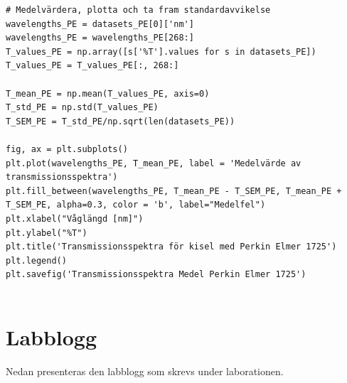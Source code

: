 \documentclass[12pt, a4paper]{article}
\begin{document}
\begin{lstlisting}[style=mypython, label={lst:dataanalys_transmission}]
# Medelvärdera, plotta och ta fram standardavvikelse
wavelengths_PE = datasets_PE[0]['nm']
wavelengths_PE = wavelengths_PE[268:]
T_values_PE = np.array([s['%T'].values for s in datasets_PE])
T_values_PE = T_values_PE[:, 268:]

T_mean_PE = np.mean(T_values_PE, axis=0)
T_std_PE = np.std(T_values_PE)
T_SEM_PE = T_std_PE/np.sqrt(len(datasets_PE))

fig, ax = plt.subplots()
plt.plot(wavelengths_PE, T_mean_PE, label = 'Medelvärde av transmissionsspektra')
plt.fill_between(wavelengths_PE, T_mean_PE - T_SEM_PE, T_mean_PE + T_SEM_PE, alpha=0.3, color = 'b', label="Medelfel")
plt.xlabel("Våglängd [nm]")
plt.ylabel("%T")
plt.title('Transmissionsspektra för kisel med Perkin Elmer 1725')
plt.legend()
plt.savefig('Transmissionsspektra Medel Perkin Elmer 1725')


\end{lstlisting}

\section{Labblogg}
Nedan presenteras den labblogg som skrevs under laborationen.

\end{document}
